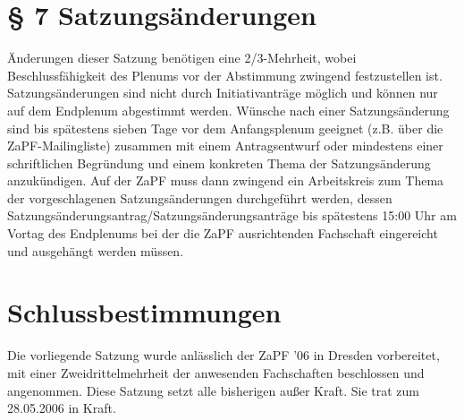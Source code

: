 \section*{§ 7 Satzungsänderungen}
Änderungen dieser Satzung benötigen eine 2/3-Mehrheit, wobei Beschlussfähigkeit des Plenums vor der Abstimmung
zwingend festzustellen ist. Satzungsänderungen sind nicht durch Initiativanträge möglich und können nur auf
dem Endplenum abgestimmt werden. Wünsche nach einer Satzungsänderung sind bis spätestens sieben Tage vor dem
Anfangsplenum geeignet (z.B. über die ZaPF-Mailingliste) zusammen mit einem Antragsentwurf oder mindestens
einer schriftlichen Begründung und einem konkreten Thema der Satzungsänderung anzukündigen. Auf der ZaPF muss
dann zwingend ein Arbeitskreis zum Thema der vorgeschlagenen Satzungsänderungen durchgeführt werden, dessen
Satzungsänderungsantrag/Satzungsänderungsanträge bis spätestens 15:00 Uhr am Vortag des Endplenums bei der
die ZaPF ausrichtenden Fachschaft eingereicht und ausgehängt werden müssen.

\section*{Schlussbestimmungen}
Die vorliegende Satzung wurde anlässlich der ZaPF '06 in Dresden vorbereitet, mit einer Zweidrittelmehrheit der
anwesenden Fachschaften beschlossen und angenommen. Diese Satzung setzt alle bisherigen außer Kraft. Sie trat zum
28.05.2006 in Kraft.




